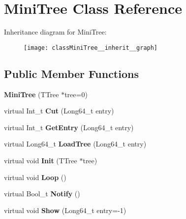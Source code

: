 \hypertarget{classMiniTree}{}\section{Mini\+Tree Class Reference}
\label{classMiniTree}


Inheritance diagram for Mini\+Tree\+:
\nopagebreak
\begin{figure}[H]
\begin{center}
\leavevmode
\texttt{[image: classMiniTree\_\_inherit\_\_graph]}
\end{center}
\end{figure}
\subsection*{Public Member Functions}
\begin{DoxyCompactItemize}
\item 
\hypertarget{classMiniTree_ade560e18f91a7fb8e98a9e2908bfe541}{}\label{classMiniTree_ade560e18f91a7fb8e98a9e2908bfe541} 
{\bfseries Mini\+Tree} (T\+Tree $\ast$tree=0)
\item 
\hypertarget{classMiniTree_ae44e86bc910cfc88b79d418ba5c7f2fc}{}\label{classMiniTree_ae44e86bc910cfc88b79d418ba5c7f2fc} 
virtual Int\+\_\+t {\bfseries Cut} (Long64\+\_\+t entry)
\item 
\hypertarget{classMiniTree_af8c76d440051486c8cc3c9dbab118ba1}{}\label{classMiniTree_af8c76d440051486c8cc3c9dbab118ba1} 
virtual Int\+\_\+t {\bfseries Get\+Entry} (Long64\+\_\+t entry)
\item 
\hypertarget{classMiniTree_a943e3bda1f28112ca236e9de888577d6}{}\label{classMiniTree_a943e3bda1f28112ca236e9de888577d6} 
virtual Long64\+\_\+t {\bfseries Load\+Tree} (Long64\+\_\+t entry)
\item 
\hypertarget{classMiniTree_a548397bc9395d7469c130c5ee1034d7f}{}\label{classMiniTree_a548397bc9395d7469c130c5ee1034d7f} 
virtual void {\bfseries Init} (T\+Tree $\ast$tree)
\item 
\hypertarget{classMiniTree_a0f6c614747f92d4c6e73173a7961a6d6}{}\label{classMiniTree_a0f6c614747f92d4c6e73173a7961a6d6} 
virtual void {\bfseries Loop} ()
\item 
\hypertarget{classMiniTree_a32993118782ee5eca564de358a6ba983}{}\label{classMiniTree_a32993118782ee5eca564de358a6ba983} 
virtual Bool\+\_\+t {\bfseries Notify} ()
\item 
\hypertarget{classMiniTree_a65ec6202f9435682c759e9e21b6d7888}{}\label{classMiniTree_a65ec6202f9435682c759e9e21b6d7888} 
virtual void {\bfseries Show} (Long64\+\_\+t entry=-\/1)
\end{DoxyCompactItemize}
